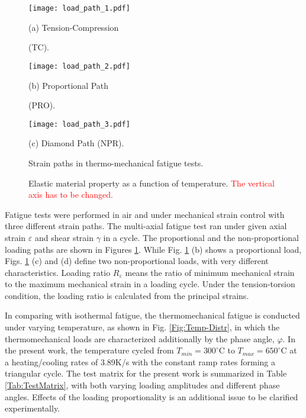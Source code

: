 \documentclass[preprint,5p,twocolumn,11pt,sort&compress]{elsarticle}
\newcommand{\marked}[1]{\textcolor{red}{#1}}
\begin{document}
\begin{figure}
  \begin{minipage}[t]{0.5\linewidth}
  \nonumber
    \centering
    \texttt{[image: load\_path\_1.pdf]}
    \centerline{\small (a) Tension-Compression}
    \centerline{\small (TC).}
  \end{minipage}%
  \begin{minipage}[t]{0.5\linewidth}
    \centering
    \texttt{[image: load\_path\_2.pdf]}
    \centerline{\small (b) Proportional Path}
    \centerline{\small (PRO).}
  \end{minipage}
  \centering
  \begin{minipage}[t]{0.5\linewidth}
  \nonumber
    \centering
    \texttt{[image: load\_path\_3.pdf]}
    \centerline{\small (c) Diamond Path (NPR).}
  \end{minipage}%
  \caption{Strain paths in thermo-mechanical fatigue tests.}
  \label{Fig:LoadPath}
\end{figure}


\begin{figure}[!htp]
\caption{Elastic material property as a function of temperature. \marked{The vertical axis has to be changed.}}
\label{Fig:plot_elastic_by_temperature_in718}
\end{figure}

Fatigue tests were performed in air and under mechanical strain control with three different strain paths. The multi-axial fatigue test  ran under given axial strain $\varepsilon$ and shear strain $\gamma$ in a cycle. The proportional and the non-proportional loading paths are shown in Figures \ref{Fig:LoadPath}. While Fig. \ref{Fig:LoadPath} (b) shows a proportional load,  Figs. \ref{Fig:LoadPath} (c) and (d) define two non-proportional loads, with very different characteristics.
Loading ratio $R_\varepsilon$ means the ratio of minimum mechanical strain to the maximum mechanical strain in a loading cycle. Under the tension-torsion condition, the loading ratio is calculated from the principal strains.

In comparing with isothermal fatigue, the thermomechanical fatigue is conducted under varying temperature, as shown in Fig. \ref{Fig:Temp-Distr}, in which the thermomechanical loads are characterized additionally by the phase angle, $\varphi$. In the present work, the temperature cycled from $T_{min}=300^\circ$C to $T_{max}=650^\circ$C at a heating/cooling rates of 3.89K/s with the constant ramp rates forming a triangular cycle. The test matrix for the present work is summarized in Table \ref{Tab:TestMatrix}, with both varying loading amplitudes and different phase angles. Effects of the loading proportionality is an additional issue to be clarified experimentally.
\end{document}
